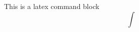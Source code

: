 \documentclass{article}
\begin{document}
This is a latex command block \begin{equation} \int  \end{equation}
\end{document}
